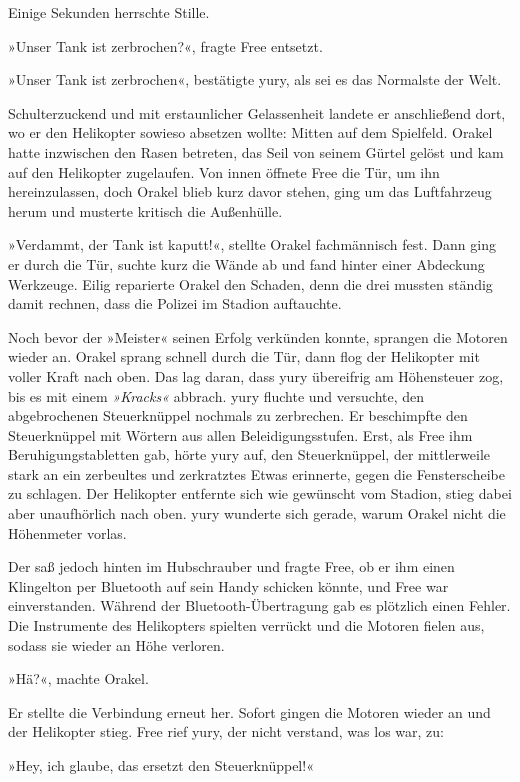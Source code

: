 Einige Sekunden herrschte Stille.

»Unser Tank ist zerbrochen?«, fragte Free entsetzt.

»Unser Tank ist zerbrochen«, bestätigte yury, als sei es das Normalste der Welt.

Schulterzuckend und mit erstaunlicher Gelassenheit landete er anschließend dort, wo er den Helikopter sowieso absetzen wollte: Mitten auf dem Spielfeld. Orakel hatte inzwischen den Rasen betreten, das Seil von seinem Gürtel gelöst und kam auf den Helikopter zugelaufen. Von innen öffnete Free die Tür, um ihn hereinzulassen, doch Orakel blieb kurz davor stehen, ging um das Luftfahrzeug herum und musterte kritisch die Außenhülle.

»Verdammt, der Tank ist kaputt!«, stellte Orakel fachmännisch fest. Dann ging er durch die Tür, suchte kurz die Wände ab und fand hinter einer Abdeckung Werkzeuge. Eilig reparierte Orakel den Schaden, denn die drei mussten ständig damit rechnen, dass die Polizei im Stadion auftauchte.

Noch bevor der »Meister« seinen Erfolg verkünden konnte, sprangen die Motoren wieder an. Orakel sprang schnell durch die Tür, dann flog der Helikopter mit voller Kraft nach oben. Das lag daran, dass yury übereifrig am Höhensteuer zog, bis es mit einem \textit{»Kracks«} abbrach. yury fluchte und versuchte, den abgebrochenen Steuerknüppel nochmals zu zerbrechen. Er beschimpfte den Steuerknüppel mit Wörtern aus allen Beleidigungsstufen. Erst, als Free ihm Beruhigungstabletten gab, hörte yury auf, den Steuerknüppel, der mittlerweile stark an ein zerbeultes und zerkratztes Etwas erinnerte, gegen die Fensterscheibe zu schlagen. Der Helikopter entfernte sich wie gewünscht vom Stadion, stieg dabei aber unaufhörlich nach oben. yury wunderte sich gerade, warum Orakel nicht die Höhenmeter vorlas.

Der saß jedoch hinten im Hubschrauber und fragte Free, ob er ihm einen Klingelton per Bluetooth auf sein Handy schicken könnte, und Free war einverstanden. Während der Bluetooth-Übertragung gab es plötzlich einen Fehler. Die Instrumente des Helikopters spielten verrückt und die Motoren fielen aus, sodass sie wieder an Höhe verloren.

»Hä?«, machte Orakel.

Er stellte die Verbindung erneut her. Sofort gingen die Motoren wieder an und der Helikopter stieg. Free rief yury, der nicht verstand, was los war, zu:

»Hey, ich glaube, das ersetzt den Steuerknüppel!«

